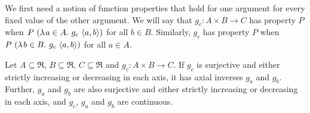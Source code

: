We first need a notion of function properties that hold for one argument for every fixed value of the other argument.
We will say that $g_c : A \times B \to C$ has property $P$  when $P~(\lambda\mspace{2mu}{a \in A}\ldotp\, g_c~\langle{a,b}\rangle)$ for all $b \in B$.
Similarly, $g_c$ has property $P$  when $P~(\lambda\mspace{2mu}{b \in B}\ldotp\, g_c~\langle{a,b}\rangle)$ for all $a \in A$.

\begin{theorem}
\label{thm:uniformly-monotone-implies-invertible}
Let $A \subseteq \Re$, $B \subseteq \Re$, $C \subseteq \Re$ and $g_c : A \times B \to C$.
If $g_c$ is surjective and either strictly increasing or decreasing in each axis, it has axial inverses $g_a$ and $g_b$.
Further, $g_a$ and $g_b$ are also surjective and either strictly increasing or decreasing in each axis, and $g_c$, $g_a$ and $g_b$ are continuous.
\end{theorem}
